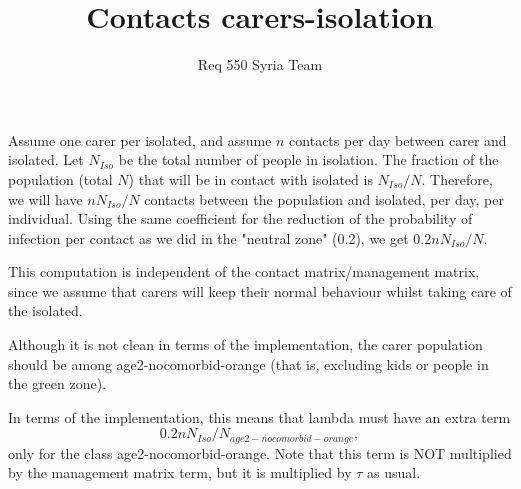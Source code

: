 \documentclass{article}
\title{Contacts carers-isolation}
\author{Req 550 Syria Team}
\begin{document}
\maketitle 

Assume one carer per isolated, and assume $n$ contacts per day between carer and isolated. Let $N_{Iso}$ be the total number of people in isolation. The fraction of the population (total $N$) that will be in contact with isolated is $N_{Iso} / N$. Therefore, we will have $ n N_{Iso} / N$ contacts between the population and isolated, per day, per individual. 
Using the same coefficient for the reduction of the probability of infection per contact as we did in the "neutral zone" (0.2), we get $ 0.2 n N_{Iso} / N $. 

This computation is independent of the contact matrix/management matrix, since we assume that carers will keep their normal behaviour whilst taking care of the isolated.

Although it is not clean in terms of the implementation, the carer population should be among age2-nocomorbid-orange (that is, excluding kids or people in the green zone).

In terms of the implementation, this means that lambda must have an extra term
\[
0.2 n N_{Iso} / N_{age2-nocomorbid-orange} ,
\]
only for the class age2-nocomorbid-orange. Note that this term is NOT multiplied by the management matrix term, but it is multiplied by $\tau$ as usual.
\end{document}

